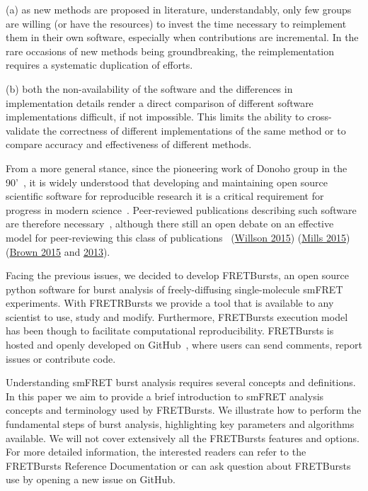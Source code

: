 (a) as new methods are proposed in literature, understandably, only few 
groups are willing (or have the resources) to invest the time necessary to reimplement them in their own
software, especially when contributions are incremental. 
In the rare occasions of new methods being groundbreaking, the reimplementation 
requires a systematic duplication of efforts. 

(b) both the non-availability of the software and the differences in implementation 
details render a direct comparison of different software implementations difficult, 
if not impossible. 
This limits the ability to cross-validate the correctness of different 
implementations of the same method or to compare accuracy and effectiveness
of different methods.

From a more general stance, since the pioneering work of Donoho group in the 90'~\cite{Buckheit_1995}, 
it is widely understood that developing and maintaining open source scientific software
for reproducible research it is a critical requirement for progress in modern 
science~\cite{Ince_2012}. Peer-reviewed publications describing such software are therefore necessary~\cite{Pradal_2013}, 
although there still an open debate on an effective model for peer-reviewing this
class of publications~\cite{Check_Hayden_2013}\cite{Check_Hayden_2015} 
(\href{https://software-carpentry.org/blog/2015/04/quality-is-free-getting-there-isnt.html}{Willson 2015})
(\href{http://https://www.mozillascience.org/effective-code-review-for-journals}{Mills 2015})
(\href{http://http://ivory.idyll.org/blog/2015-we-live-in-a-bubble.html}{Brown 2015} and \href{http://http://ivory.idyll.org/blog/on-code-review-of-scientific-code.html}{2013}).

Facing the previous issues, we decided to develop FRETBursts, 
an open source python software for burst analysis of freely-diffusing
single-molecule smFRET experiments. 
With FRETRBursts we provide a tool that is available to any scientist
to use, study and modify. Furthermore, FRETBursts execution model has been though
to facilitate computational reproducibility.
FRETBursts is hosted and openly developed on GitHub~\cite{Prli__2012}, 
where users can send comments, report issues or contribute code.

Understanding smFRET burst analysis requires several concepts and definitions.
In this paper we aim to provide a brief introduction to smFRET analysis concepts
and terminology used by FRETBursts. We illustrate how to perform
the fundamental steps of burst analysis, highlighting key parameters
and algorithms available. We will not cover extensively all the FRETBursts
features and options. For more detailed information, the interested readers can refer
to the FRETBursts Reference Documentation or can ask question about FRETBursts use by opening 
a new issue on GitHub.

